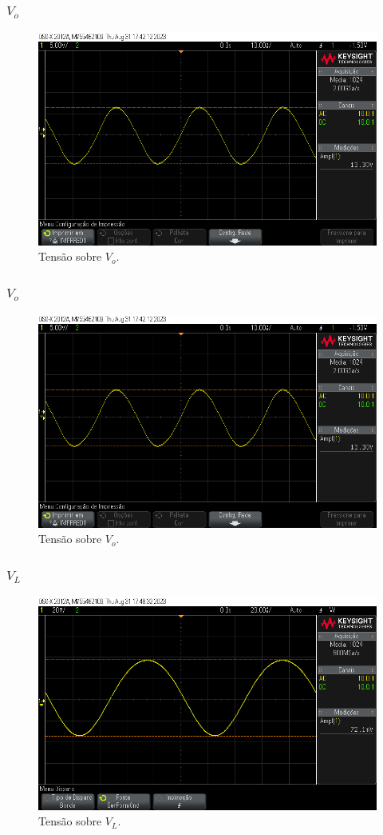 \subsubsection{$V_{o}$}

\begin{figure}[H]
    \centering
    \includegraphics[width=0.5\columnwidth]{images/V_o.png}
    \caption{Tensão sobre $V_{o}$.}
\end{figure}

\subsubsection{$V_{o}$}

\begin{figure}[H]
    \centering
    \includegraphics[width=0.5\columnwidth]{images/V_o.png}
    \caption{Tensão sobre $V_{o}$.}
\end{figure}


\subsubsection{$V_{L}$}

\begin{figure}[H]
    \centering
    \includegraphics[width=0.5\columnwidth]{images/V_L.png}
    \caption{Tensão sobre $V_{L}$.}
\end{figure}

